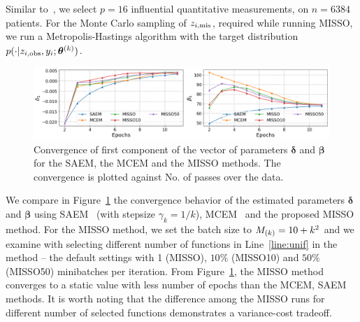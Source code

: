 \documentclass[11pt]{article}
\theoremstyle{t}
\begin{document}
Similar to~\citep{jiang2018logistic}, we select $p = 16$ influential quantitative measurements, on $n = 6384$ patients.
For the Monte Carlo sampling of $z_{i,\mis}$, required while running MISSO, we run a Metropolis-Hastings algorithm with the target distribution $p( \cdot |z_{i,\obs}, y_i; \hp{k})$.

\begin{figure}[H]
\includegraphics[width=\textwidth]{pic_paper/traumabasenoexp.png}\vspace{-.2cm}
\caption{Convergence of first component of the vector of parameters ${\bm \delta}$ and ${\bm \beta}$ for the SAEM, the MCEM and the MISSO methods. The convergence is plotted against No. of passes over the data.}\vspace{-.2cm}
\label{fig:misso_trauma}
\end{figure}
\vspace{-.2cm}
We compare in Figure~\ref{fig:misso_trauma} the convergence behavior of the estimated parameters $\bm{\delta}$ and $\bm{\beta}$ using SAEM~\citep{delyon1999} (with stepsize $\gamma_k = 1/k$), MCEM~\citep{wei1990mcem}  and the proposed MISSO method.
For the MISSO method, we set the batch size to $\Bsize{k} = 10 + k^2$ and we examine with selecting different number of functions in Line~\ref{line:unif} in the method -- the default settings with 1 (MISSO), $10\%$ (MISSO10) and $50\%$ (MISSO50) minibatches per iteration.
From Figure~\ref{fig:misso_trauma}, the MISSO method converges to a static value with less number of epochs than the MCEM, SAEM methods.
It is worth noting that the difference among the MISSO runs for different number of selected functions demonstrates a variance-cost tradeoff.

\vspace{-0.05in}
\end{document}
